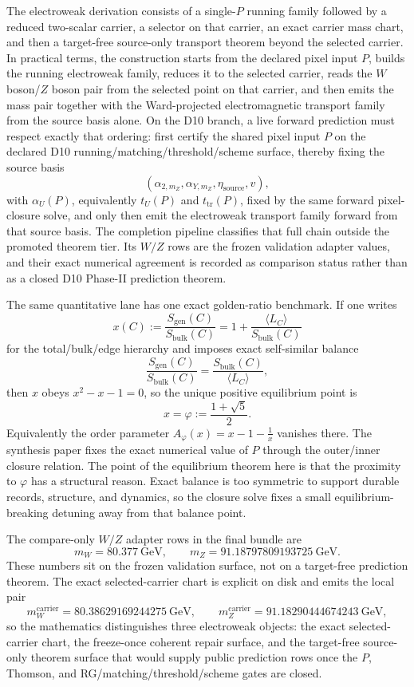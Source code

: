 \documentclass[11pt]{article}
\begin{document}
The electroweak derivation consists of a single-\(P\) running family followed by a
reduced two-scalar carrier, a selector on that carrier, an exact carrier mass chart, and
then a target-free source-only transport theorem beyond the selected carrier. In practical terms, the construction starts from
the declared pixel input \(P\), builds the running electroweak family, reduces it to the selected
carrier, reads the \(W\) boson/\(Z\) boson pair from the selected point on that carrier,
and then emits the mass pair together with the Ward-projected electromagnetic transport family from
the source basis alone.
On the D10 branch, a live forward prediction must respect exactly that ordering: first certify
the shared pixel input \(P\) on the declared D10 running/matching/threshold/scheme surface, thereby fixing the source basis
\[
(\alpha_{2,m_Z},\alpha_{Y,m_Z},\eta_{\mathrm{source}},v),
\]
with \(\alpha_U(P)\), equivalently \(t_U(P)\) and \(t_{\mathrm{tr}}(P)\), fixed by the
same forward pixel-closure solve,
and only then emit the electroweak transport family forward from that source basis. The completion
pipeline classifies that full chain outside the promoted theorem tier. Its \(W/Z\) rows are the
frozen validation adapter values, and their exact numerical agreement is recorded as comparison
status rather than as a closed D10 Phase-II prediction theorem.

The same quantitative lane has one exact golden-ratio benchmark. If one writes
\[
x(C):=\frac{S_{\mathrm{gen}}(C)}{S_{\mathrm{bulk}}(C)}
=
1+\frac{\langle L_C\rangle}{S_{\mathrm{bulk}}(C)}
\]
for the total/bulk/edge hierarchy and imposes exact self-similar balance
\[
\frac{S_{\mathrm{gen}}(C)}{S_{\mathrm{bulk}}(C)}
=
\frac{S_{\mathrm{bulk}}(C)}{\langle L_C\rangle},
\]
then \(x\) obeys \(x^2-x-1=0\), so the unique positive equilibrium point is
\[
x=\varphi:=\frac{1+\sqrt5}{2}.
\]
Equivalently the order parameter \(A_\varphi(x)=x-1-\frac1x\) vanishes there. The synthesis paper
fixes the exact numerical value of \(P\) through the outer/inner closure relation. The point of
the equilibrium theorem here is that the proximity to \(\varphi\) has a structural reason. Exact
balance is too symmetric to support durable records, structure, and dynamics, so the closure solve
fixes a small
equilibrium-breaking detuning away from that balance point.

The compare-only \(W/Z\) adapter rows in the final bundle are
\[
m_W = 80.377~\mathrm{GeV},
\qquad
m_Z = 91.18797809193725~\mathrm{GeV}.
\]
These numbers sit on the frozen validation surface, not on a target-free prediction theorem.
The exact selected-carrier chart is explicit on disk and emits
the local pair
\[
m_W^{\mathrm{carrier}} = 80.38629169244275~\mathrm{GeV},
\qquad
m_Z^{\mathrm{carrier}} = 91.18290444674243~\mathrm{GeV},
\]
so the mathematics distinguishes three electroweak objects: the exact selected-carrier chart, the
freeze-once coherent repair surface, and the target-free source-only theorem surface that would supply
public prediction rows once the \(P\), Thomson, and RG/matching/threshold/scheme gates are closed.
\end{document}
